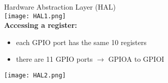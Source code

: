 \begin{definition}{Hardware Abstraction Layer (HAL)}\\
    \texttt{[image: HAL1.png]}\\
    \textbf{Accessing a register:}
    \begin{itemize}
        \item each GPIO port has the same 10 registers 
        \item there are 11 GPIO ports $\rightarrow$ GPIOA to GPIOI
    \end{itemize}
    \texttt{[image: HAL2.png]}
\end{definition}


